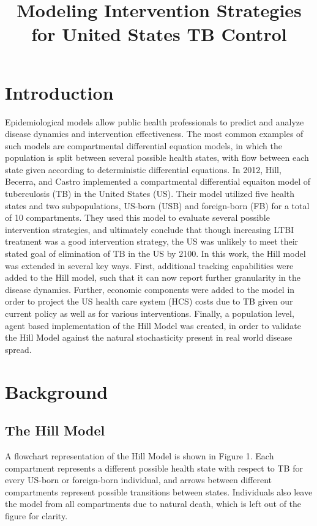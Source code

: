 \documentclass{amsart}
\title{Modeling Intervention Strategies for United States TB Control}
\begin{document}
\maketitle

\section{Introduction}
Epidemiological models allow public health professionals to predict and analyze
disease dynamics and intervention effectiveness. The most common examples of
such models are compartmental differential equation models, in which the
population is split between several possible health states, with flow between
each state given according to deterministic differential equations. In 2012, 
Hill, Becerra, and Castro implemented a compartmental
differential equaiton model of tuberculosis (TB) in the United States (US).
Their model utilized five health states and two subpopulations, US-born (USB)
and foreign-born (FB) for a total of 10 compartments. They used this model to
evaluate several possible intervention strategies, and ultimately conclude that
though increasing LTBI treatment was a good intervention strategy, the US was
unlikely to meet their stated goal of elimination of TB in the US by 2100. In
this work, the Hill model was extended in several key ways. First, additional
tracking capabilities were added to the Hill model, such that it can now report
further granularity in the disease dynamics. Further, economic components were
added to the model in order to project the US health care system (HCS) costs due
to TB given our current policy as well as for various interventions. Finally, a
population level, agent based implementation of the Hill Model was created, in
order to validate the Hill Model against the natural stochasticity present in
real world disease spread. 

\section{Background}

\subsection{The Hill Model}
A flowchart representation of the Hill Model is shown in Figure 1.  Each compartment
represents a different possible health state with respect to TB for every 
US-born or foreign-born individual, and arrows between different compartments
represent possible transitions between states.  Individuals also leave the model 
from all compartments due to natural death, which is left out of the figure for clarity.  \\
\end{document}
